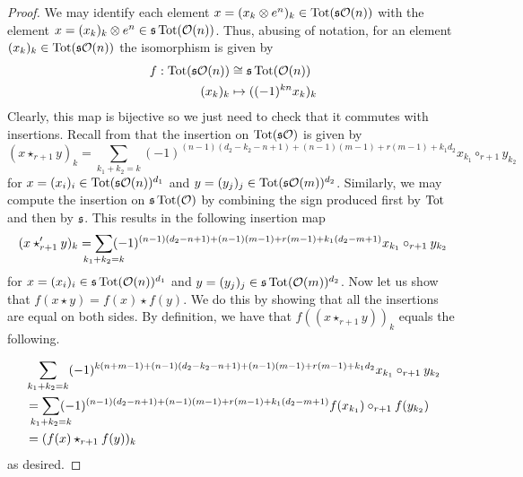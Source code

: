 \documentclass[Thesis.tex]{subfiles}
\begin{document}
\begin{proof}
 We may identify each element $x=(x_k\otimes e^n )_k\in\operatorname{Tot}(\mathfrak{s}{\mathcal O}(n))$ with the element $x=(x_k)_k\otimes e^n\in\mathfrak{s}\operatorname{Tot}({\mathcal O}(n))$. Thus, abusing of notation, for an element $(x_k)_k\in \operatorname{Tot}(\mathfrak{s}{\mathcal O}(n))$ the isomorphism is given by
\begin{align*}
f:\operatorname{Tot}(\mathfrak{s}{\mathcal O}(n))&\cong \mathfrak{s} \operatorname{Tot}({\mathcal O}(n))\\
(x_k)_k&\mapsto ((-1)^{kn}x_k)_k
\end{align*}
Clearly, this map is bijective so we just need to check that it commutes with insertions. Recall from  that the insertion on $\operatorname{Tot}(\mathfrak{s}{\mathcal O})$ is given by
\begin{equation*}
(x\star_{r+1} y)_k=\sum_{k_1+k_2=k}(-1)^{(n-1)(d_2-k_2-n+1)+(n-1)(m-1)+r(m-1)+k_1d_2}x_{k_1}\circ_{r+1}y_{k_2}
\end{equation*}
for $x=(x_i)_i\in \operatorname{Tot}(\mathfrak{s}{\mathcal O}(n))^{d_1}$ and $y=(y_j)_j\in \operatorname{Tot}(\mathfrak{s}{\mathcal O}(m))^{d_2}$. Similarly, we may compute the insertion on $\mathfrak{s}\operatorname{Tot}({\mathcal O})$ by combining the sign produced first by $\operatorname{Tot}$ and then by $\mathfrak{s}$. This results in the following insertion map 
\begin{equation*}
(x\star_{r+1}' y)_k=\sum_{\mathclap{k_1+k_2=k}}(-1)^{(n-1)(d_2-n+1)+(n-1)(m-1)+r(m-1)+k_1(d_2-m+1)}x_{k_1}\circ_{r+1}y_{k_2}
\end{equation*}
for $x=(x_i)_i\in \mathfrak{s}\operatorname{Tot}({\mathcal O}(n))^{d_1}$ and $y=(y_j)_j\in \mathfrak{s}\operatorname{Tot}({\mathcal O}(m))^{d_2}$. Now let us show that $f(x\star y)=f(x)\star f(y)$. We do this by showing that all the insertions are equal on both sides. By definition, we have that $f((x\star_{r+1} y))_k$ equals the following.

\begin{align*}
&\sum_{k_1+k_2=k}(-1)^{k(n+m-1)+(n-1)(d_2-k_2-n+1)+(n-1)(m-1)+r(m-1)+k_1d_2}x_{k_1}\circ_{r+1}y_{k_2}\\
&=\sum_{\mathclap{k_1+k_2=k}}(-1)^{(n-1)(d_2-n+1)+(n-1)(m-1)+r(m-1)+k_1(d_2-m+1)}f(x_{k_1})\circ_{r+1}f(y_{k_2})\\
&=(f(x)\star_{r+1} f(y))_k
\end{align*}
as desired.
\end{proof}
\end{document}
